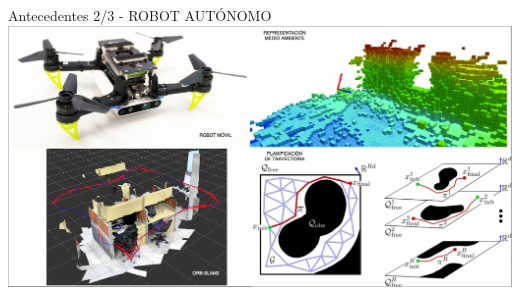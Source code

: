 \documentclass[
  24pt, %
  aspectratio=169, %
]{beamer}
\begin{document}
\begin{frame}{Antecedentes 2/3 - ROBOT AUTÓNOMO}
  \centering
  \includegraphics[width=\linewidth]{ANTECEDENTES}\\
\end{frame}
\end{document}
